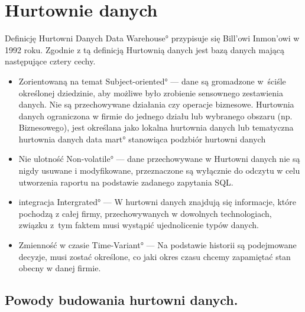 \chapter{Hurtownie danych}


Definicję Hurtowni Danych \ang{Data Warehouse}  przypisuje się Bill'owi Inmon'owi w 1992 roku.
Zgodnie z tą definicją Hurtownią danych jest bazą danych mającą następujące cztery cechy.

\begin{itemize}
 \item Zorientowaną na temat \ang{ Subject-oriented} --- 
    dane są gromadzone 
    w~ściśle określonej dziedzinie, aby możliwe było zrobienie sensownego zestawienia danych.
   Nie są przechowywane działania czy operacje biznesowe. Hurtownia danych ograniczona w firmie do jednego działu 
    lub wybranego obszaru (np. Biznesowego),
    jest określana jako lokalna hurtownia danych 
    lub tematyczna hurtownia danych \ang{data mart} stanowiąca podzbiór hurtowni danych
 \item Nie ulotność \ang{Non-volatile} --- 
    dane przechowywane w Hurtowni danych nie są nigdy usuwane i modyfikowane, 
    przeznaczone są wyłącznie do odczytu w celu utworzenia raportu na podstawie zadanego zapytania SQL.
 \item integracja \ang{Intergrated} --- W hurtowni danych znajdują się informacje, 
   które pochodzą z całej firmy, przechowywanych w dowolnych technologiach,
   związku z~tym faktem musi wystąpić ujednolicenie typów danych.

 \item Zmienność w czasie \ang{Time-Variant} --- Na podstawie historii są podejmowane decyzje, musi zostać określone,
  co jaki okres czasu chcemy zapamiętać stan obecny w danej firmie.

\end{itemize}


\section{Powody budowania hurtowni danych.}
   
